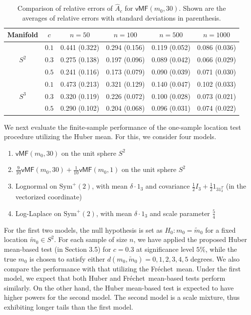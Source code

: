 \documentclass[preprint]{imsart}
\def\Frechet{Fr\'{e}chet}
\theoremstyle{plain}
\theoremstyle{remark}
\begin{document}
\begin{appendix}
\begin{table}[t]
\centering
\caption{Comparison of relative errors of $\hat{A}_c$ for $\textsf{vMF}(m_0, 30)$. Shown are the averages of relative errors with standard deviations in parenthesis.}
\label{tab:comparison}
\begin{tabular}{cccccc}
\hline
Manifold & $c$ & \( n = 50 \) & \( n = 100 \) & \( n = 500 \) & \( n = 1000 \) \\ \hline
&  \( 0.1 \) & 0.441 (0.322) & 0.294 (0.156) & 0.119 (0.052) & 0.086 (0.036) \\ 
\( S^2\) &  \( 0.3 \) & 0.275 (0.138) & 0.197 (0.096) & 0.089 (0.042) & 0.066 (0.029)\\
&  \( 0.5 \) & 0.241 (0.116) & 0.173 (0.079) & 0.090 (0.039) & 0.071 (0.030)\\ \hline
& \( 0.1 \) & 0.473 (0.213) & 0.321 (0.129) & 0.140 (0.047) & 0.102 (0.033)\\
\( S^3\)&  \(0.3 \) & 0.320 (0.119) & 0.226 (0.072) & 0.100 (0.028) & 0.073 (0.021)\\
& \( 0.5 \) & 0.290 (0.102) & 0.204 (0.068) & 0.096 (0.031) & 0.074 (0.022) \\ \hline
\end{tabular}
\end{table}



We next evaluate the finite-sample performance of the one-sample location test procedure utilizing the Huber mean. For this, we consider four models. 
\begin{enumerate}
    \item $\textsf{vMF}(m_0,30)$ on the unit sphere $S^2$
    \item $\tfrac{9}{10}\textsf{vMF}(m_0,30) + \tfrac{1}{10}\textsf{vMF}(m_0,1)$ on the unit sphere $S^2$
    \item Lognormal on $\mbox{Sym}^+(2)$, with mean $\delta \cdot 1_3$ and covariance $\tfrac{1}{2}I_3 +\tfrac{1}{2}1_31_3^T$ (in the vectorized coordinate)
    \item Log-Laplace on $\mbox{Sym}^+(2)$, with mean $\delta \cdot 1_3$ and scale parameter $\tfrac{5}{4}$
\end{enumerate}
For the first two models, the null hypothesis is set as $H_0:m_0 = \tilde{m}_0$ for a fixed location $\tilde{m}_0 \in S^2$. For each sample of size $n$, we have applied the proposed Huber mean-based test (in Section 3.5) for $c= 0.3$ at significance level $5\%$, while the true $m_0$ is chosen to satisfy either  
$d(m_0, \tilde{m}_0) = 0, 1, 2, 3, 4, 5$ degrees. We also compare the performance with that utilizing the \Frechet\ mean. Under the first model, we expect that both Huber and \Frechet\ mean-based tests perform similarly. On the other hand, the Huber mean-based test is expected to have higher powers for the second model. The second model is a scale mixture, thus exhibiting longer tails than the first model. 


\end{appendix}
\end{document}
